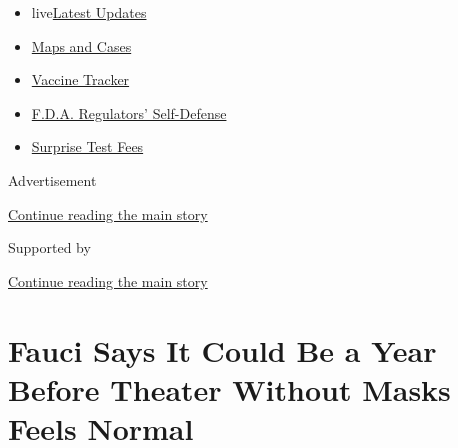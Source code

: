 \begin{itemize}
\tightlist
\item
  live\href{https://www.nytimes3xbfgragh.onion/2020/09/12/world/covid-19-coronavirus.html?name=styln-coronavirus-national\&region=TOP_BANNER\&block=storyline_menu_recirc\&action=click\&pgtype=Article\&impression_id=814d29c0-f52e-11ea-89a3-d9fd6cbe23e4\&variant=undefined}{Latest
  Updates}
\item
  \href{https://www.nytimes3xbfgragh.onion/interactive/2020/us/coronavirus-us-cases.html?name=styln-coronavirus-national\&region=TOP_BANNER\&block=storyline_menu_recirc\&action=click\&pgtype=Article\&impression_id=814d29c1-f52e-11ea-89a3-d9fd6cbe23e4\&variant=undefined}{Maps
  and Cases}
\item
  \href{https://www.nytimes3xbfgragh.onion/interactive/2020/science/coronavirus-vaccine-tracker.html?name=styln-coronavirus-national\&region=TOP_BANNER\&block=storyline_menu_recirc\&action=click\&pgtype=Article\&impression_id=814d29c2-f52e-11ea-89a3-d9fd6cbe23e4\&variant=undefined}{Vaccine
  Tracker}
\item
  \href{https://www.nytimes3xbfgragh.onion/2020/09/10/us/politics/fda-coronavirus-vaccine.html?name=styln-coronavirus-national\&region=TOP_BANNER\&block=storyline_menu_recirc\&action=click\&pgtype=Article\&impression_id=814d29c3-f52e-11ea-89a3-d9fd6cbe23e4\&variant=undefined}{F.D.A.
  Regulators' Self-Defense}
\item
  \href{https://www.nytimes3xbfgragh.onion/2020/09/09/upshot/coronavirus-surprise-test-fees.html?name=styln-coronavirus-national\&region=TOP_BANNER\&block=storyline_menu_recirc\&action=click\&pgtype=Article\&impression_id=814d29c4-f52e-11ea-89a3-d9fd6cbe23e4\&variant=undefined}{Surprise
  Test Fees}
\end{itemize}

Advertisement

\protect\hyperlink{after-top}{Continue reading the main story}

Supported by

\protect\hyperlink{after-sponsor}{Continue reading the main story}

\hypertarget{fauci-says-it-could-be-a-year-before-theater-without-masks-feels-normal}{%
\section{Fauci Says It Could Be a Year Before Theater Without Masks
Feels
Normal}\label{fauci-says-it-could-be-a-year-before-theater-without-masks-feels-normal}}

